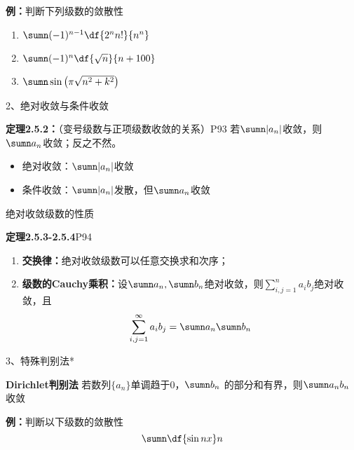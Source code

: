 \begin{frame}
	\linespread{1.5}
	\begin{exampleblock}{{\bf 例：}判断下列级数的敛散性\hfill}
		\begin{enumerate}\pause 
		  \item $\sumn(-1)^{n-1}\df{2^nn!}{n^n}$\pause 
		  \item $\sumn(-1)^n\df{\sqrt{n}}{n+100}$\pause 
		  \item $\sumn\sin\left(\pi\sqrt{n^2+k^2}\right)$
		\end{enumerate}
	\end{exampleblock}
\end{frame}

\begin{frame}{2、绝对收敛与条件收敛}
	\linespread{1.5}\pause 
	\begin{block}{{\bf 定理2.5.2：}（变号级数与正项级数收敛的关系）\hfill P93}\pause 
		若$\sumn |a_n|$收敛，则$\sumn a_n$收敛；\pause 反之\alert{不}然。
	\end{block}\pause 
	\begin{itemize}
	  \item {\bb 绝对收敛：}\pause $\sumn |a_n|$收敛\pause 
	  \item {\bb 条件收敛：}\pause $\sumn |a_n|$发散，但$\sumn a_n$收敛
	\end{itemize}
\end{frame}

\begin{frame}{绝对收敛级数的性质}
	\linespread{1.2}\pause 
	\begin{block}{{\bf 定理2.5.3-2.5.4}\hfill P94}
		\begin{enumerate}\pause 
		  \item {\bf 交换律：}绝对收敛级数可以任意交换求和次序；\pause 
		  \item {\bf 级数的Cauchy乘积：}设$\sumn a_n,\sumn
		  b_n$绝对收敛，则$\sum\limits_{i,j=1}^na_ib_j$绝对收敛，且
		  $$\sum\limits_{i,j=1}^{\infty}a_ib_j=\sumn a_n\sumn b_n$$
		\end{enumerate}
	\end{block}
\end{frame}

\begin{frame}{3、特殊判别法*}
	\linespread{1.5}\pause 
	\begin{block}{{\bf Dirichlet判别法}\hfill}
		若数列$\{a_n\}$单调趋于$0$，$\sumn b_n$
		  的部分和有界，则$\sumn a_nb_n$收敛\pause 
	\end{block}
	\begin{exampleblock}{{\bf 例：}判断以下级数的敛散性\hfill}
		  $$\sumn\df{\sin nx}n$$ 
	\end{exampleblock}
\end{frame}

